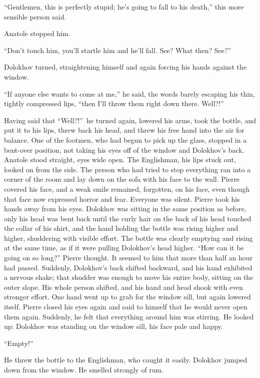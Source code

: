 ``Gentlemen, this is perfectly stupid; he's going to fall to his death,'' this more sensible person said.

Anatole stopped him.

``Don't touch him, you'll startle him and he'll fall. See? What then? See?'' %

Dolokhov turned, straightening himself and again forcing his hands against the window. 

``If anyone else wants to come at me,'' he said, the words barely escaping his thin, tightly compressed lips, ``then I'll throw them right down there. Well?!'' %

Having said that ``Well?!''~he turned again, lowered his arms, took the bottle, and put it to his lips, threw back his head, and threw his free hand into the air for balance. One of the footmen, who had begun to pick up the glass, stopped in a bent-over position, not taking his eyes off of the window and Dolokhov's back. Anatole stood straight, eyes wide open. The Englishman, his lips stuck out, looked on from the side. The person who had tried to stop everything ran into a corner of the room and lay down on the sofa with his face to the wall. Pierre covered his face, and a weak smile remained, forgotten, on his face, even though that face now expressed horror and fear. Everyone was silent. Pierre took his hands away from his eyes. Dolokhov was sitting in the same position as before, only his head was bent back until the curly hair on the back of his head touched the collar of his shirt, and the hand holding the bottle was rising higher and higher, shuddering with visible effort. The bottle was clearly emptying and rising at the same time, as if it were pulling Dolokhov's head higher. ``How can it be going on so long?'' Pierre thought. It seemed to him that more than half an hour had passed. Suddenly, Dolokhov's back shifted backward, and his hand exhibited a nervous shake; that shudder was enough to move his entire body, sitting on the outer slope. His whole person shifted, and his hand and head shook with even stronger effort. One hand went up to grab for the window sill, but again lowered itself. Pierre closed his eyes again and said to himself that he would never open them again. Suddenly, he felt that everything around him was stirring. He looked up: Dolokhov was standing on the window sill, his face pale and happy.

``Empty!'' %

He threw the bottle to the Englishman, who caught it easily. Dolokhov jumped down from the window. He smelled strongly of rum.

